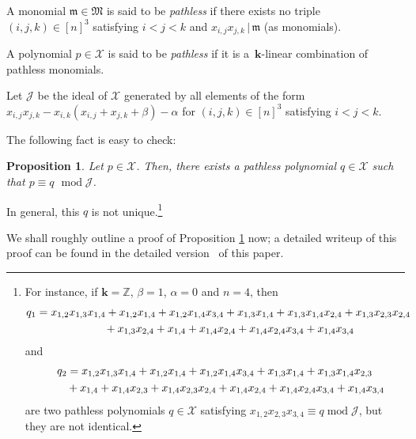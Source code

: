 \documentclass[11pt]{article}
\newtheorem{Proposition}[Theorem]{Proposition}
\numberwithin{equation}{section}
\begin{document}
\begin{Definition} A monomial $\mathfrak{m}\in\mathfrak{M}$ is said to be \textit{pathless} if there exists no triple $(i,j,k) \in[n] ^{3}$ satisfying $i<j<k$ and $x_{i,j}x_{j,k}\,|\,\mathfrak{m}$ (as monomials).

A polynomial $p\in\mathcal{X}$ is said to be \textit{pathless} if it is a~$\mathbf{k}$-linear combination of pathless monomials.
\end{Definition}

\begin{Definition} Let $\mathcal{J}$ be the ideal of $\mathcal{X}$ generated by all elements of the form $x_{i,j}x_{j,k}-x_{i,k} ( x_{i,j}+x_{j,k}+\beta ) -\alpha$ for $(i,j,k) \in[n] ^{3}$ satisfying $i<j<k$.
\end{Definition}

The following fact is easy to check:

\begin{Proposition}\label{prop.path-red.span}Let $p\in\mathcal{X}$. Then, there exists a pathless polynomial $q\in\mathcal{X}$ such that $p\equiv q$ $\operatorname{mod} \mathcal{J}$.
\end{Proposition}

In general, this $q$ is not unique.\footnote{For instance, if $\mathbf{k}=\mathbb{Z}$, $\beta=1$, $\alpha=0$ and $n=4$, then
\begin{gather*}
q_{1} =x_{1,2}x_{1,3}x_{1,4}+x_{1,2}x_{1,4}+x_{1,2}x_{1,4}x_{3,4} +x_{1,3}x_{1,4}+x_{1,3}x_{1,4}x_{2,4}+x_{1,3}x_{2,3}x_{2,4}\\
\hphantom{q_{1} =}{} +x_{1,3}x_{2,4}+x_{1,4}+x_{1,4}x_{2,4}+x_{1,4}x_{2,4}x_{3,4}+x_{1,4}x_{3,4}%
\end{gather*}
and%
\begin{gather*}
q_{2} =x_{1,2}x_{1,3}x_{1,4}+x_{1,2}x_{1,4}+x_{1,2}x_{1,4}x_{3,4}+x_{1,3}x_{1,4}+x_{1,3}x_{1,4}x_{2,3}\\
\hphantom{q_{2} =}{} +x_{1,4}+x_{1,4}x_{2,3}+x_{1,4}x_{2,3}x_{2,4}+x_{1,4}x_{2,4}+x_{1,4}x_{2,4}x_{3,4}+x_{1,4}x_{3,4}
\end{gather*}
are two pathless polynomials $q\in\mathcal{X}$ satisfying $x_{1,2}x_{2,3}x_{3,4}\equiv q\operatorname{mod}\mathcal{J}$, but they are not identical.}

We shall roughly outline a proof of Proposition \ref{prop.path-red.span} now; a detailed writeup of this proof can be found in the detailed version~\cite{verlong} of this paper.
\end{document}
